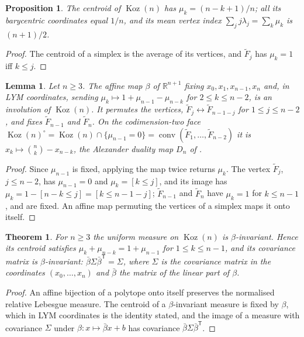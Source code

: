 \documentclass[11pt, a4paper, abstract=yes]{scrartcl}
\theoremstyle{definition}
\theoremstyle{remark}
\theoremstyle{plain}
\newtheorem{lemma}[definition]{Lemma}
\newtheorem{proposition}[definition]{Proposition}
\newtheorem{theorem}[definition]{Theorem}
\theoremstyle{remark}
\theoremstyle{plain}
\newcommand{\Koz}{\operatorname{Koz}}
\newcommand{\conv}{\operatorname{conv}}
\newcommand{\leandiscof}[1]{\tikz[baseline=-0.6ex]\fill[#1] (0,0) circle (0.6ex);}
\newcommand{\leanfull}{\leandiscof{leanfull}}
\newcommand{\leanmark}[1]{\leavevmode{\reversemarginpar\marginnote{\raggedleft#1}}}
\let\autocite\cite
\begin{document}
\begin{proposition}
\leanmark{\leanfull}The centroid of \(\Koz(n)\) has \(\mu_k=(n-k+1)/n\); all its barycentric coordinates equal \(1/n\),
and its mean vertex index \(\sum_jj\lambda_j=\sum_k\mu_k\) is \((n+1)/2\).
\label{prop-centroid-simplex}
\end{proposition}

\begin{proof}
The centroid of a simplex is the average of its vertices, and \(\tilde F_j\) has \(\mu_k=1\) iff
\(k\le j\).
\end{proof}

\begin{lemma}
\leanmark{\leanfull}Let \(n\ge3\). The affine map \(\beta\) of \(\mathbb R^{n+1}\) fixing \(x_0,x_1,x_{n-1},x_n\) and, in LYM
coordinates, sending \(\mu_k\mapsto1+\mu_{n-1}-\mu_{n-k}\) for \(2\le k\le n-2\), is an involution of
\(\Koz(n)\). It permutes the vertices, \(\tilde F_j\leftrightarrow\tilde F_{n-1-j}\) for
\(1\le j\le n-2\), and fixes \(\tilde F_{n-1}\) and \(\tilde F_n\). On the codimension-two face
\(\Koz(n)^\circ=\Koz(n)\cap\lbrace\mu_{n-1}=0\rbrace=\conv(\tilde F_1,\dots,\tilde F_{n-2})\) it is
\(x_k\mapsto\binom nk-x_{n-k}\), the Alexander duality map \(D_n\) of \autocite[Definition 13]{SnellmanArticle2}.
\label{lem-beta}
\end{lemma}

\begin{proof}
Since \(\mu_{n-1}\) is fixed, applying the map twice returns \(\mu_k\). The vertex \(\tilde F_j\),
\(j\le n-2\), has \(\mu_{n-1}=0\) and \(\mu_k=[k\le j]\), and its image has
\(\mu_k=1-[n-k\le j]=[k\le n-1-j]\); \(\tilde F_{n-1}\) and \(\tilde F_n\) have \(\mu_k=1\) for
\(k\le n-1\), and are fixed. An affine map permuting the vertices of a simplex maps it onto itself.
\end{proof}

\begin{theorem}
\leanmark{\leanfull}For \(n\ge3\) the uniform measure on \(\Koz(n)\) is \(\beta\)-invariant. Hence its centroid satisfies
\(\mu_k+\mu_{n-k}=1+\mu_{n-1}\) for \(1\le k\le n-1\), and its covariance matrix is \(\beta\)-invariant:
\(\bar\beta\Sigma\bar\beta^{\mathsf T}=\Sigma\), where \(\Sigma\) is the covariance matrix in the coordinates
\((x_0,\dots,x_n)\) and \(\bar\beta\) the matrix of the linear part of \(\beta\).
\label{thm-beta-continuous}
\end{theorem}

\begin{proof}
An affine bijection of a polytope onto itself preserves the normalised relative Lebesgue measure.
The centroid of a \(\beta\)-invariant measure is fixed by \(\beta\), which in LYM coordinates is the
identity stated, and the image of a measure with covariance \(\Sigma\) under \(\beta:x\mapsto\bar\beta x+b\) has
covariance \(\bar\beta\Sigma\bar\beta^{\mathsf T}\).
\end{proof}
\end{document}
